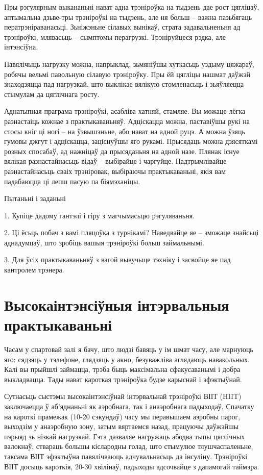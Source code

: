 Пры рэгулярным выкананьні нават адна трэніроўка на тыдзень дае рост цягліцаў, аптымальна дзьве-тры трэніроўкі на тыдзень, але ня больш – важна пазьбягаць ператрэніраванасьці. Зьніжэньне сілавых вынікаў, страта задавальненьня ад трэніроўкі, млявасьць – сымптомы перагрузкі. Трэніруйцеся рэдка, але інтэнсіўна.

Павялічыць нагрузку можна, напрыклад, зьмяніўшы хуткасьць уздыму цяжараў, робячы вельмі павольную сілавую трэніроўку. Пры ёй цягліцы нашмат даўжэй знаходзяцца пад нагрузкай, што выклікае вялікую стомленасьць і зьяўляецца стымулам да цяглічнага росту.

Аднатыпная праграма трэніроўкі, асабліва хатняй, стамляе. Вы можаце лёгка разнастаіць кожнае з практыкаваньняў. Адціскацца можна, паставіўшы рукі на стосы кніг ці ногі – на ўзвышэньне, або нават на адной руцэ. А можна ўзяць гумовы джгут і адціскацца, заціснуўшы яго рукамі. Прысядаць можна дзясяткамі розных спосабаў, ад нажніцаў да прысяданьня на адной назе. Плянак існуе вялікая разнастайнасьць відаў – выбірайце і чаргуйце. Падтрымлівайце разнастайнасьць сваіх трэніровак, выбіраючы практыкаваньні, якія вам падабаюцца ці лепш пасую па біямэханіцы.

Пытаньні і заданьні

1. Купіце дадому гантэлі і гіру з магчымасьцю рэгуляваньня.

2. Ці ёсьць побач з вамі пляцоўка з турнікамі? Наведвайце яе – зможаце знайсьці аднадумцаў, што зробіць вашыя трэніроўкі больш займальнымі.

3. Для ўсіх практыкаваньняў з вагой вывучыце тэхніку і засвойце яе пад кантролем трэнера.


\section{Высокаінтэнсіўныя інтэрвальныя практыкаваньні}

Часам у спартовай залі я бачу, што людзі бавяць у ім шмат часу, але марнуюць яго: сядзяць у тэлефоне, глядзяць у акно, безуважліва аглядаюць навакольных. Калі вы прыйшлі займацца, трэба быць максімальна сфакусаванымі і добра выкладвацца. Тады нават кароткая трэніроўка будзе карыснай і эфэктыўнай.

Сутнасьць сыстэмы высокаінтэнсіўнай інтэрвальнай трэніроўкі ВІІТ (HIIT) заключаецца ў аб'яднаньні як аэробнага, так і анаэробнага падыходаў. Спачатку на кароткі прамежак (10-20 сэкундаў) часу мы перавышаем аэробны парог, выходзім у анаэробную зону, затым вяртаемся назад, працуючы даўжэйшы пэрыяд зь нізкай нагрузкай. Гэта дазваляе нагружаць абодва тыпы цяглічных валокнаў, ствараць большы кіслародны голад, што стымулюе тлушчаспаленьне, таксама ВІІТ эфэктыўна павялічваюць адчувальнасьць да інсуліну. Трэніроўкі ВІІТ досыць кароткія, 20-30 хвілінаў, падыходы адсочвайце з дапамогай таймэра.

